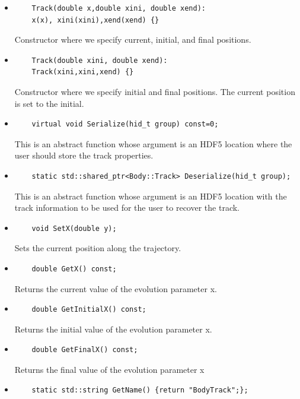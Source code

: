 \documentclass[3p,12pt]{elsarticle}
\newcommand{\ttf}{\ttfamily}
\begin{document}
\begin{itemize}
\item  
  \begin{lstlisting}
    Track(double x,double xini, double xend):
    x(x), xini(xini),xend(xend) {}
  \end{lstlisting}
  Constructor where we specify current, initial, and final positions. 
\item  
  \begin{lstlisting}
    Track(double xini, double xend):
    Track(xini,xini,xend) {}
  \end{lstlisting}
  Constructor where we specify initial and final positions. The
  current position is set to the initial. 
  \item  
  \begin{lstlisting}
    virtual void Serialize(hid_t group) const=0;
  \end{lstlisting}
  This is an abstract function whose argument is an HDF5 location
  where the user should store the track properties.
  \item  
  \begin{lstlisting}
    static std::shared_ptr<Body::Track> Deserialize(hid_t group);
  \end{lstlisting}
  This is an abstract function whose argument is an HDF5 location
  with the track information to be used for the user to recover the track.
\item  
  \begin{lstlisting}
    void SetX(double y);
  \end{lstlisting}
  Sets the current position along the trajectory.  
\item  
  \begin{lstlisting}
    double GetX() const;
  \end{lstlisting}
  Returns the current value of the evolution parameter {\ttf x}.
\item  
  \begin{lstlisting}
    double GetInitialX() const;
  \end{lstlisting}    
  Returns the initial value of the evolution parameter {\ttf x}.
\item  
  \begin{lstlisting}
    double GetFinalX() const;
  \end{lstlisting}          
  Returns the final value of the evolution parameter {\ttf x}
\item  
  \begin{lstlisting}
    static std::string GetName() {return "BodyTrack";};

\end{lstlisting}
\end{itemize}
\end{document}

